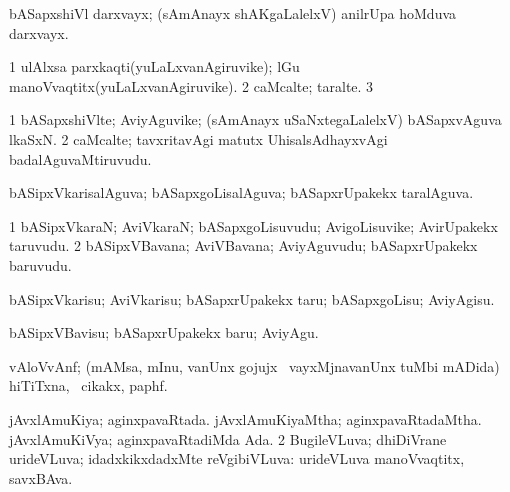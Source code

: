 {{{{{{{{{{{{\bentry
{} 
\gl{\nA}
\expl{}
\bmng
 bASapxshiVl darxvayx; (sAmAnayx shAKgaLalelxV) anilrUpa hoMduva darxvayx. 
\emng
\eentry

\bentry
{} 
\gl{\nA}
\expl{}
\bmng
\bnum
\num{1} ulAlxsa parxkaqti(yuLaLxvanAgiruvike); lGu manoVvaqtitx(yuLaLxvanAgiruvike). 
\num{2} caMcalte; taralte. 
\num{3} 
\enum
\emng
\eentry

\bentry 
{} 
\gl{\nA}
\expl{}
\bmng
\emng
\eentry

\bentry
{} 
\gl{\kirx}
\expl{}
\bmng
\emng
\eentry

\bentry 
{} 
\gl{\nA}
\expl{}
\bmng
\bnum
\num{1} bASapxshiVlte; AviyAguvike; (sAmAnayx uSaNxtegaLalelxV) bASapxvAguva lkaSxN. 
\num{2} caMcalte; tavxritavAgi matutx UhisalsAdhayxvAgi badalAguvaMtiruvudu. 
\enum
\emng
\eentry

\bentry
{} 
\gl{\gu}
\expl{}
\bmng
 bASipxVkarisalAguva; bASapxgoLisalAguva; bASapxrUpakekx taralAguva. 
\emng
\eentry

\bentry 
{} 
\gl{\nA}
\expl{}
\bmng
\bnum
\num{1} bASipxVkaraN; AviVkaraN; bASapxgoLisuvudu; AvigoLisuvike; AvirUpakekx taruvudu. 
\num{2} bASipxVBavana; AviVBavana; AviyAguvudu; bASapxrUpakekx baruvudu. 
\enum
\emng
\eentry

\bentry 
{} 
\gl{\sakirx}
\expl{}
\bmng
 bASipxVkarisu; AviVkarisu; bASapxrUpakekx taru; bASapxgoLisu; AviyAgisu. 
\emng

\noindent 
\gl{\akirx}
\expl{}
\bmng
 bASipxVBavisu; bASapxrUpakekx baru; AviyAgu. 
\emng
\eentry

\bentry 
{} 
\gl{\nA}
\expl{}
\bmng
 vAloVvAnf; (mAMsa, mInu, \mo vanUnx gojujx \mo\ vayxMjnavanUnx tuMbi mADida) hiTiTxna, \sA\ cikakx, paphf. 
\emng
\eentry

\bentry
{} 
\gl{\gu}
\expl{}
\bmng
\bnum
{} 
\banum
{} jAvxlAmuKiya; aginxpavaRtada. 
 jAvxlAmuKiyaMtha; aginxpavaRtadaMtha. 
 jAvxlAmuKiVya; aginxpavaRtadiMda Ada. 
\eanum
\numie
\num{2} BugileVLuva; dhiDiVrane urideVLuva; idadxkikxdadxMte reVgibiVLuva:  urideVLuva manoVvaqtitx, savxBAva. 
\enum
\emng
\eentry

}}}}}}}}}}}}
